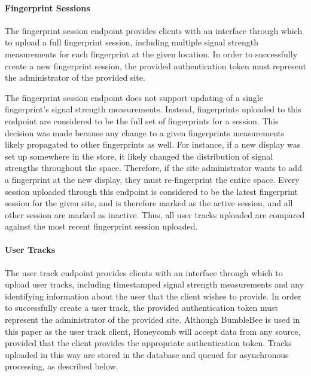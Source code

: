\paragraph{Fingerprint Sessions}
%

The fingerprint session endpoint provides clients with an interface through which to upload a full fingerprint session, including multiple signal strength measurements for each fingerprint at the given location. In order to successfully create a new fingerprint session, the provided authentication token must represent the administrator of the provided site. 

The fingerprint session endpoint does not support updating of a single fingerprint's signal strength measurements. Instead, fingerprints uploaded to this endpoint are considered to be the full set of fingerprints for a session. This decision was made because any change to a given fingerprints measurements likely propagated to other fingerprints as well. For instance, if a new display was set up somewhere in the store, it likely changed the distribution of signal strengths throughout the space. Therefore, if the site administrator wants to add a fingerprint at the new display, they must re-fingerprint the entire space. Every session uploaded through this endpoint is considered to be the latest fingerprint session for the given site, and is therefore marked as the active session, and all other session are marked as inactive. Thus, all user tracks uploaded are compared against the most recent fingerprint session uploaded.


\paragraph{User Tracks}
%

The user track endpoint provides clients with an interface through which to upload user tracks, including timestamped signal strength measurements and any identifying information about the user that the client wishes to provide. In order to successfully create a user track, the provided authentication token must represent the administrator of the provided site. Although BumbleBee is used in this paper as the user track client, Honeycomb will accept data from any source, provided that the client provides the appropriate authentication token. Tracks uploaded in this way are stored in the database and queued for asynchronous processing, as described below.

